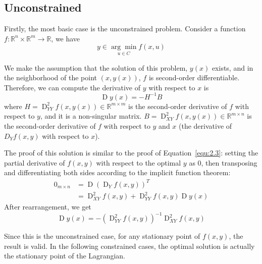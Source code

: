 \subsection{Unconstrained}
Firstly, the most basic case is the unconstrained problem. Consider a function $f: \mathbb{R}^n \times \mathbb{R}^m \rightarrow \mathbb{R}$, we have
\begin{equation}
    y \in \underset{u \in C}{\arg \min } f(x, u)
\end{equation}
\par We make the assumption that the solution of this problem, $y(x)$ exists, and in the neighborhood of the point $(x, y(x))$, $f$ is second-order differentiable. Therefore, we can compute the derivative of $y$ with respect to $x$ is
$$
\operatorname{D}y(x) = -H^{-1}B
$$
where $H = \operatorname{D}_{YY}^2 f(x, y(x)) \in \mathbb{R}^{m \times m}$ is the second-order derivative of $f$ with respect to $y$, and it is a non-singular matrix. $B = \operatorname{D}_{XY}^2 f(x, y(x)) \in \mathbb{R}^{m \times n}$ is the second-order derivative of $f$ with respect to $y$ and $x$ (the derivative of $D_Yf(x,y)$ with respect to $x$). 
\par The proof of this solution is similar to the proof of Equation~\ref{equ:2.3}: setting the partial derivative of $f(x,y)$ with respect to the optimal $y$ as 0, then transposing and differentiating both sides according to the implicit function theorem: 
\begin{equation}
    \begin{aligned} 
        0_{m \times n} &=\operatorname{D}\left(\operatorname{D}_{Y} f(x, y)\right)^{T} \\ &=\operatorname{D}_{X Y}^{2} f(x, y)+\operatorname{D}_{Y Y}^{2} f(x, y) \operatorname{D} y(x) 
    \end{aligned}
\end{equation}
After rearrangement, we get
\begin{equation}
    \operatorname{D} y(x)=-\left(\operatorname{D}_{Y Y}^{2} f(x, y)\right)^{-1} \operatorname{D}_{X Y}^{2} f(x, y)
\end{equation}
\par Since this is the unconstrained case, for any stationary point of $f(x,y)$, the result is valid. In the following constrained cases, the optimal solution is actually the stationary point of the Lagrangian. 

